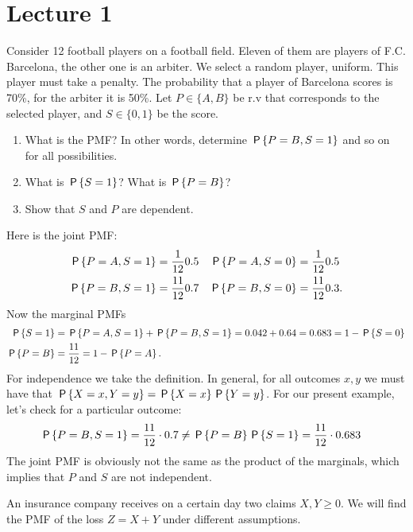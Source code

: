 \documentclass[lectures]{subfiles}
\begin{document}
\section{Lecture 1}



\begin{exercise}
Consider 12 football players on a football field.
Eleven of them are players of F.C. Barcelona, the other one is an arbiter.
We select a random player, uniform.
This player must take a penalty.
The probability that a player of Barcelona scores is 70\%, for the arbiter it is 50\%.
Let $P\in \{A, B\}$ be r.v that corresponds to the selected player, and $S\in\{0,1\}$ be the score.
\begin{enumerate}
\item What is the PMF? In other words, determine $\P{P = B, S=1}$ and so on for all possibilities.
\item What is $\P{S=1}$? What is $\P{P=B}$?
\item Show that $S$ and $P$ are dependent.
\end{enumerate}
\begin{solution}
Here is the joint PMF:
\begin{align}
\P{P=A, S=1} &= \frac{1}{12}0.5 & \P{P=A, S=0} &= \frac{1}{12}0.5 \\
\P{P=B, S=1} &= \frac{11}{12}0.7 & \P{P=B, S=0} &= \frac{11}{12}0.3.
\end{align}
Now the marginal PMFs
\begin{align*}
\P{S=1}  &= \P{P=A, S=1} + \P{P=B, S=1} = 0.042 + 0.64 = 0.683 = 1-\P{S=0}\\
\P{P=B}  &= \frac{11}{12} = 1-\P{P=A}.
\end{align*}
For independence we take the definition.
In general, for all outcomes $x,y$ we must have that $\P{X=x, Y=y} = \P{X=x}\P{Y=y}$.
For our present example, let's check for  a particular outcome:
\begin{align*}
\P{P=B, S=1} &= \frac{11}{12}\cdot0.7 \neq \P{P=B}\P{S=1} = \frac{11}{12} \cdot 0.683
\end{align*}
The joint PMF is obviously not the same as the product of the marginals, which implies that $P$ and $S$ are not independent.
\end{solution}
\end{exercise}



An insurance company receives on a certain day two claims $X, Y \geq 0$.
We will find the PMF of the loss $Z=X+Y$ under different assumptions.
\end{document}
